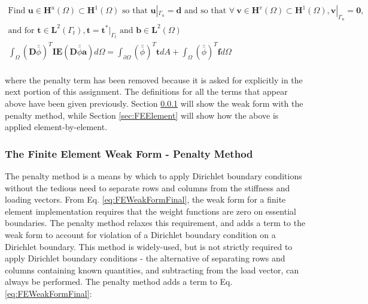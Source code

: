\documentclass[10pt]{article}
\begin{document}
\begin{tcolorbox}
\begin{equation}
\label{eq:FEWeakFormFinal}
\begin{aligned}
\text{Find }\textbf{u}\in \textbf{H}^u(\Omega)\subset \textbf{H}^1(\Omega) \text{ so that } \textbf{u}|_{\Gamma_u}=\textbf{d} \text{ and so that }\forall\ \textbf{v} \in \textbf{H}^v(\Omega)\subset \textbf{H}^1(\Omega), \textbf{v}|_{\Gamma_u}=\textbf{0},\\
\text{and for }\textbf{t}\in\textbf{L}^2(\Gamma_t), \textbf{t}=\textbf{t}^{*}|_{\Gamma_t}\text{ and }\textbf{b}\in\textbf{L}^2(\Omega)\\
\int_{\Omega}(\textbf{D}\bar{\bar{\phi}})^T\textbf{IE}(\textbf{D}\bar{\bar{\phi}}\textbf{a})d\Omega =\int_{\partial\Omega}(\bar{\bar{\phi}})^T\textbf{t}dA+\int_{\Omega}(\bar{\bar{\phi}})^T\textbf{f}d\Omega\\
\end{aligned}
\end{equation}
\end{tcolorbox}

where the penalty term has been removed because it is asked for explicitly in the next portion of this assignment. The definitions for all the terms that appear above have been given previously. Section \ref{sec:Penalty} will show the weak form with the penalty method, while Section \ref{sec:FEElement} will show how the above is applied element-by-element.

\subsubsection{The Finite Element Weak Form - Penalty Method}
\label{sec:Penalty}

The penalty method is a means by which to apply Dirichlet boundary conditions without the tedious need to separate rows and columns from the stiffness and loading vectors. From Eq. \eqref{eq:FEWeakFormFinal}, the weak form for a finite element implementation requires that the weight functions are zero on essential boundaries. The penalty method relaxes this requirement, and adds a term to the weak form to account for violation of a Dirichlet boundary condition on a Dirichlet boundary. This method is widely-used, but is not strictly required to apply Dirichlet boundary conditions - the alternative of separating rows and columns containing known quantities, and subtracting from the load vector, can always be performed. The penalty method adds a term to Eq. \eqref{eq:FEWeakFormFinal}:
\end{document}
